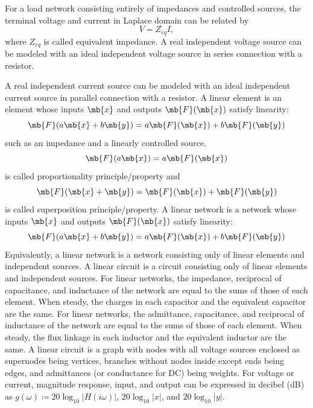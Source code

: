 \documentclass[a4paper,12pt]{article}
\begin{document}
For a load network consisting entirely of impedances and controlled sources, the terminal voltage and current in Laplace domain can be related by
\[V=Z_{eq}I,\]
where $Z_{eq}$ is called equivalent impedance.
A real independent voltage source can be modeled with an ideal independent voltage source in series connection with a resistor.

A real independent current source can be modeled with an ideal independent current source in parallel connection with a resistor.
A linear element is an element whose inputs $\mb{x}$ and outputs $\mb{F}(\mb{x})$ satisfy linearity:
\[\mb{F}(a\mb{x}+b\mb{y})=a\mb{F}(\mb{x})+b\mb{F}(\mb{y})\]
such as an impedance and a linearly controlled source.
\[\mb{F}(a\mb{x})=a\mb{F}(\mb{x})\]
is called proportionality principle/property and
\[\mb{F}(\mb{x}+\mb{y})=\mb{F}(\mb{x})+\mb{F}(\mb{y})\]
is called superposition principle/property.
A linear network is a network whose inputs $\mb{x}$ and outputs $\mb{F}(\mb{x})$ satisfy linearity:
\[\mb{F}(a\mb{x}+b\mb{y})=a\mb{F}(\mb{x})+b\mb{F}(\mb{y})\]
Equivalently, a linear network is a network consisting only of linear elements and independent sources.
A linear circuit is a circuit consisting only of linear elements and independent sources.
For linear networks, the impedance, reciprocal of capacitance, and inductance of the network are equal to the sums of those of each element. When steady, the charges in each capacitor and the equivalent capacitor are the same.
For linear networks, the admittance, capacitance, and reciprocal of inductance of the network are equal to the sums of those of each element. When steady, the flux linkage in each inductor and the equivalent inductor are the same.
A linear circuit is a graph with nodes with all voltage sources enclosed as supernodes being vertices, branches without nodes inside except ends being edges, and admittances (or conductance for DC) being weights.
For voltage or current, magnitude response, input, and output can be expressed in decibel (dB) as $g(\omega)\coloneq 20\log_{10}|H(i\omega)|$, $20\log_{10}|x|$, and $20\log_{10}|y|$.
\end{document}
